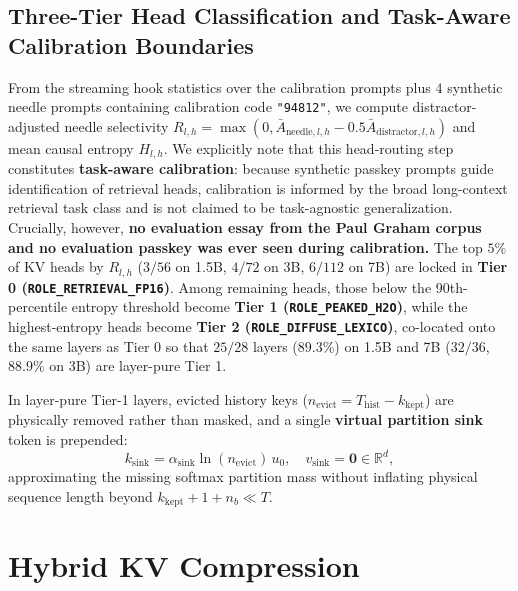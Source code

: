 \documentclass[conference]{IEEEtran}
\begin{document}
\subsection{Three-Tier Head Classification and Task-Aware Calibration Boundaries}
From the streaming hook statistics over the calibration prompts plus $4$ synthetic needle prompts containing calibration code \texttt{"94812"}, we compute distractor-adjusted needle selectivity $R_{l,h} = \max(0, \bar{A}_{\text{needle},l,h} - 0.5\bar{A}_{\text{distractor},l,h})$ and mean causal entropy $H_{l,h}$. We explicitly note that this head-routing step constitutes \textbf{task-aware calibration}: because synthetic passkey prompts guide identification of retrieval heads, calibration is informed by the broad long-context retrieval task class and is not claimed to be task-agnostic generalization. Crucially, however, \textbf{no evaluation essay from the Paul Graham corpus and no evaluation passkey was ever seen during calibration.} The top $5\%$ of KV heads by $R_{l,h}$ ($3/56$ on 1.5B, $4/72$ on 3B, $6/112$ on 7B) are locked in \textbf{Tier 0 (\texttt{ROLE\_RETRIEVAL\_FP16})}. Among remaining heads, those below the 90th-percentile entropy threshold become \textbf{Tier 1 (\texttt{ROLE\_PEAKED\_H2O})}, while the highest-entropy heads become \textbf{Tier 2 (\texttt{ROLE\_DIFFUSE\_LEXICO})}, co-located onto the same layers as Tier 0 so that $25/28$ layers ($89.3\%$) on 1.5B and 7B ($32/36$, $88.9\%$ on 3B) are layer-pure Tier 1.

In layer-pure Tier-1 layers, evicted history keys ($n_{\text{evict}} = T_{\text{hist}} - k_{\text{kept}}$) are physically removed rather than masked, and a single \textbf{virtual partition sink} token is prepended:
\begin{equation}
k_{\text{sink}} = \alpha_{\text{sink}}\ln(n_{\text{evict}})\,u_0, \quad v_{\text{sink}} = \mathbf{0} \in \mathbb{R}^d,
\label{eq:virtual_sink}
\end{equation}
approximating the missing softmax partition mass without inflating physical sequence length beyond $k_{\text{kept}} + 1 + n_b \ll T$.

\section{Hybrid KV Compression}
\end{document}
